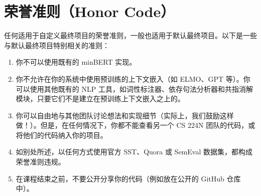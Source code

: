 \documentclass[11pt]{article}
\begin{document}
\section{荣誉准则（Honor Code）}

任何适用于自定义最终项目的荣誉准则，一般也适用于默认最终项目。以下是一些与默认最终项目特别相关的准则：

\begin{enumerate}
  \item 你不可以使用既有的 minBERT 实现。
  \item 你不允许在你的系统中使用预训练的上下文嵌入（如 ELMO、GPT 等）。你可以使用其他既有的 NLP 工具，如词性标注器、依存句法分析器和共指消解模块，只要它们不是建立在预训练上下文嵌入之上的。
  \item 你可以自由地与其他团队讨论想法和实现细节（实际上，我们鼓励这样做！）。但是，在任何情况下，你都不能查看另一个 CS 224N 团队的代码，或将他们的代码纳入你的项目。
  \item 如别处所述，以任何方式使用官方 SST、Quora 或 SemEval 数据集，都构成荣誉准则违规。
  \item 在课程结束之前，不要公开分享你的代码（例如放在公开的 GitHub 仓库中）。
\end{enumerate}
\end{document}
